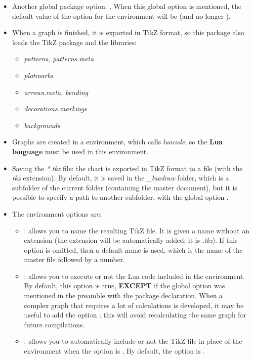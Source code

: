 \begin{itemize}
    \item Another global package option: . When this global option is mentioned, the default value of the  option for the \luadrawenv environment will be \false (and no longer \true).

    \item When a graph is finished, it is exported in TikZ format, so this package also loads the TikZ package and the libraries:

    \begin{itemize}
    \item\emph{patterns, patterns.meta}
    \item\emph{plotmarks}
    \item\emph{arrows.meta, bending}
    \item\emph{decorations.markings}
    \item\emph{backgrounds}
    \end{itemize}
    
    \item Graphs are created in a \luadrawenv environment, which calls \emph{luacode}, so the \textbf{Lua language} must be used in this environment.

    \item Saving the \emph{*.tkz} file: the chart is exported in TikZ format to a file (with the \emph{tkz} extension). By default, it is saved in the \emph{\_luadraw} folder, which is a subfolder of the current folder (containing the master document), but it is possible to specify a path to another subfolder, with the global option .

    \item The environment options are:
    
    \begin{itemize}
        \item {}: allows you to name the resulting TikZ file. It is given a name without an extension (the extension will be automatically added; it is \emph{.tkz}). If this option is omitted, then a default name is used, which is the name of the master file followed by a number.

        \item {}: allows you to execute or not the Lua code included in the environment. By default, this option is true, \textbf{EXCEPT} if the global option  was mentioned in the preamble with the package declaration. When a complex graph that requires a lot of calculations is developed, it may be useful to add the option ; this will avoid recalculating the same graph for future compilations.

        \item {}: allows you to automatically include or not the TikZ file in place of the \luadrawenv environment when the  option is \false. By default, the  option is \true.
    \end{itemize}
\end{itemize}


